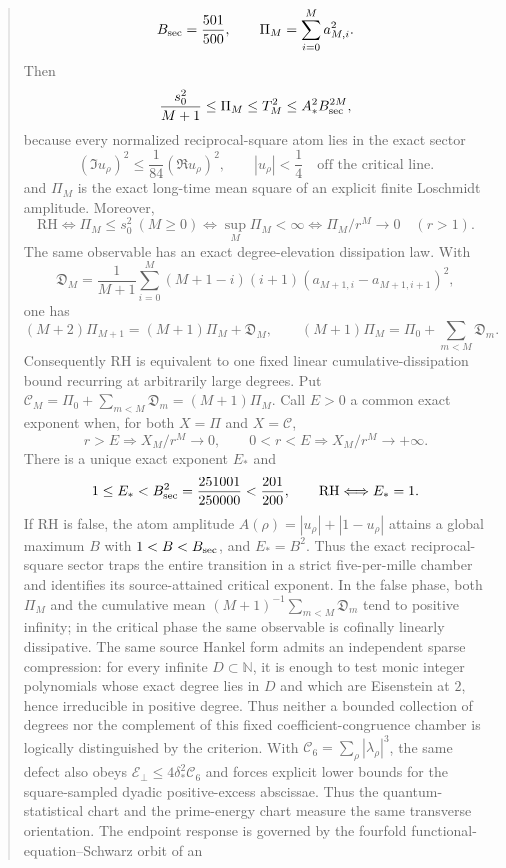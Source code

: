 \documentclass[11pt]{article}
\begin{document}
\begin{abstract}
\[ B_{\rm sec}=\frac{501}{500},\qquad
 \Pi_M=\sum_{i=0}^M a_{M,i}^2.
\]
Then
\[
 \frac{s_0^2}{M+1}\le\Pi_M\le T_M^2\le A_*^2B_{\rm sec}^{2M},
\]
because every normalized reciprocal-square atom lies in the exact sector
\[
 (\Im u_\rho)^2\le\frac1{84}(\Re u_\rho)^2,
 \qquad |u_\rho|<\frac14\quad\text{off the critical line}.
\]
and $\Pi_M$ is the exact long-time mean square of an explicit finite Loschmidt amplitude.
Moreover,
\[
 \mathrm{RH}\Longleftrightarrow
 \Pi_M\le s_0^2\ (M\ge0)
 \Longleftrightarrow \sup_M\Pi_M<\infty
 \Longleftrightarrow \Pi_M/r^M\to0\quad(r>1).
\]
The same observable has an exact degree-elevation dissipation law.  With
\[
 \mathfrak D_M=\frac1{M+1}\sum_{i=0}^{M}(M+1-i)(i+1)
   (a_{M+1,i}-a_{M+1,i+1})^2,
\]
one has
\[
 (M+2)\Pi_{M+1}=(M+1)\Pi_M+\mathfrak D_M,
 \qquad
 (M+1)\Pi_M=\Pi_0+\sum_{m<M}\mathfrak D_m.
\]
Consequently RH is equivalent to one fixed linear cumulative-dissipation bound recurring at
arbitrarily large degrees.  Put
\(\mathcal C_M=\Pi_0+\sum_{m<M}\mathfrak D_m=(M+1)\Pi_M\).
Call $E>0$ a common exact exponent when, for both $X=\Pi$ and $X=\mathcal C$,
\[
 r>E\Longrightarrow X_M/r^M\to0,
 \qquad 0<r<E\Longrightarrow X_M/r^M\to+\infty.
\]
There is a unique exact exponent $E_*$ and
\[
 1\le E_*<B_{\rm sec}^2=\frac{251001}{250000}<\frac{201}{200},
 \qquad \mathrm{RH}\Longleftrightarrow E_*=1.
\]
If RH is false, the atom amplitude
$A(\rho)=|u_\rho|+|1-u_\rho|$ attains a global maximum $B$ with
$1<B<B_{\rm sec}$, and $E_*=B^2$.  Thus the exact reciprocal-square sector traps the entire
transition in a strict five-per-mille chamber and identifies its source-attained critical
exponent.  In the false phase, both $\Pi_M$ and the cumulative mean
$(M+1)^{-1}\sum_{m<M}\mathfrak D_m$ tend to positive infinity; in the critical phase the same
observable is cofinally linearly dissipative.
The same source Hankel form
admits an independent
sparse compression: for every infinite $D\subset\mathbb N$, it is enough to test monic integer
polynomials whose exact degree lies in $D$ and which are Eisenstein at $2$, hence irreducible in
positive degree.  Thus neither a bounded collection of degrees nor the complement of this fixed
coefficient-congruence chamber is logically distinguished by the criterion.  With
$\mathcal C_6=\sum_\rho|\lambda_\rho|^3$, the same defect also obeys
$\mathcal E_\perp\le4\delta_*^2\mathcal C_6$ and forces explicit lower bounds for the
square-sampled dyadic positive-excess abscissae.  Thus the quantum-statistical chart and the
prime-energy chart measure the same transverse orientation.
The endpoint response is governed by the fourfold functional-equation--Schwarz orbit of an

\end{abstract}
\end{document}

